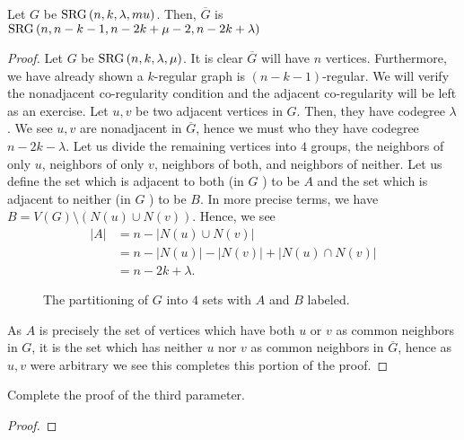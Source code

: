 \begin{proposition}
	Let $G$ be $\operatorname{SRG} \left( n, k, \lambda, mu \right) $. Then, $\overline{G}$ is $\operatorname{SRG} \left( n, n-k-1, n-2k+\mu -2, n-2k + \lambda \right) $
\end{proposition}
\begin{proof}
	Let $G$ be $\operatorname{SRG} \left( n, k, \lambda, \mu \right) $. It is clear $\overline{G}$ will have $n$ vertices. Furthermore, we have already shown a $k$-regular graph is $\left( n-k-1 \right) $-regular. We will verify the nonadjacent co-regularity condition and the adjacent co-regularity will be left as an exercise. Let $u, v$ be two adjacent vertices in $G$. Then, they have codegree $\lambda$. We see $u, v$ are nonadjacent in $\overline{G}$, hence we must who they have codegree $n-2k-\lambda$. Let us divide the remaining vertices into $4$ groups, the neighbors of only $u$, neighbors of only $v$, neighbors of both, and neighbors of neither. Let us define the set which is adjacent to both (in $G$ ) to be $A$ and the set which is adjacent to neither (in $G$ ) to be $B$. In more precise terms, we have $B = V\left( G \right)  \setminus \left( N\left( u \right)  \cup N\left( v \right)  \right) $. Hence, we see \begin{align*}
	\left| A \right| &= n - \left| N\left( u \right)  \cup N\left( v \right)  \right|\\
			 &= n - \left| N\left( u \right)  \right|  - \left| N\left( v \right)  \right|  + \left| N\left( u \right)  \cap N\left( v \right)  \right| \\
			 &= n -2k + \lambda.
\end{align*}
\begin{figure}[ht]
    \centering
    \caption{The partitioning of \(G\) into \(4\) sets with \(A\) and \(B\) labeled.}
    \label{fig:vtxpart}
\end{figure}
As $A$ is precisely the set of vertices which have both $u$ or $v$ as common neighbors in $G$, it is the set which has neither $u$ nor $v$ as common neighbors in $\overline{G}$, hence as $u, v$ were arbitrary we see this completes this portion of the proof.
\end{proof}
\begin{problem}
	Complete the proof of the third parameter.
\end{problem}
\begin{proof}

\end{proof}
